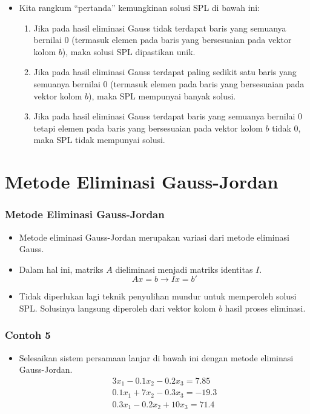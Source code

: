 \documentclass[pdflatex,compress,mathserif]{beamer}
\begin{document}
\begin{frame}
	\begin{itemize}
		\item Kita rangkum “pertanda” kemungkinan solusi SPL di bawah ini:
		\begin{enumerate}
			\item Jika pada hasil eliminasi Gauss tidak terdapat baris yang semuanya bernilai 0 (termasuk elemen pada baris yang bersesuaian pada vektor kolom $ b $), maka solusi SPL dipastikan unik.
			\item Jika pada hasil eliminasi Gauss terdapat paling sedikit satu baris yang semuanya bernilai 0 (termasuk elemen pada baris yang bersesuaian pada vektor kolom $ b $), maka SPL mempunyai banyak solusi.
			\item Jika pada hasil eliminasi Gauss terdapat baris yang semuanya bernilai 0 tetapi elemen pada baris yang bersesuaian pada vektor kolom $ b $ tidak 0, maka SPL tidak mempunyai solusi.
		\end{enumerate}
	\end{itemize}
\end{frame}

\section{Metode Eliminasi Gauss-Jordan}

\begin{frame}
	\frametitle{Metode Eliminasi Gauss-Jordan}
	\begin{itemize}
		\item Metode eliminasi Gauss-Jordan merupakan variasi dari metode eliminasi Gauss.
		\item Dalam hal ini, matriks $ A $ dieliminasi menjadi matriks identitas $ I $.
		\[ Ax = b \rightarrow Ix = b' \]
		\item Tidak diperlukan lagi teknik penyulihan mundur untuk memperoleh solusi SPL. Solusinya langsung diperoleh dari vektor kolom $ b $ hasil proses eliminasi.
	\end{itemize}
\end{frame}

\begin{frame}
	\frametitle{Contoh 5}
	\begin{itemize}
		\item Selesaikan sistem persamaan lanjar di bawah ini dengan metode eliminasi Gauss-Jordan.
		\begin{align*}
		3x_1 - 0.1x_2 - 0.2x_3 = 7.85 \\
		0.1x_1 + 7x_2 - 0.3x_3 = -19.3 \\
		0.3x_1 - 0.2x_2 + 10x_3 = 71.4
		\end{align*}
	\end{itemize}
\end{frame}
\end{document}
